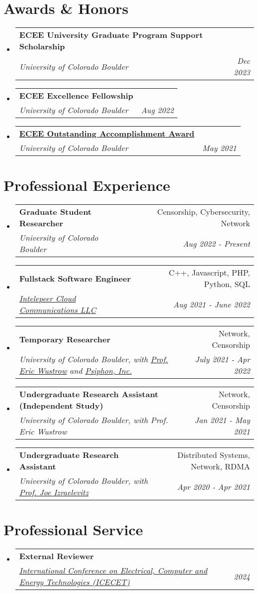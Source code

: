 \documentclass[letterpaper,11pt]{article}
\makeatletter
\newcommand{\resumeItem}[1]{
  \item\small{
    {#1 \vspace{-2pt}}
  }
}
\newcommand{\resumeSubheading}[4]{
  \vspace{-2pt}\item
    \begin{tabular*}{0.97\textwidth}[t]{l@{\extracolsep{\fill}}r}
      \textbf{#1} & #2 \\
      \textit{\small#3} & \textit{\small #4} \\
    \end{tabular*}\vspace{-7pt}
}
\newcommand{\resumeSubHeadingListStart}{\begin{itemize}[leftmargin=0.15in, label={}]}
\newcommand{\resumeSubHeadingListEnd}{\end{itemize}}
\newcommand{\resumeItemListStart}{\begin{itemize}}
\newcommand{\resumeItemListEnd}{\end{itemize}\vspace{-5pt}}
\makeatother
\begin{document}
\section{Awards \& Honors}
\resumeSubHeadingListStart
\resumeSubheading
{ECEE University Graduate Program Support Scholarship}{}
{University of Colorado Boulder}{Dec 2023}
\resumeSubheading
{ECEE Excellence Fellowship}{}
{University of Colorado Boulder}{Aug 2022}
\resumeSubheading
{\href{https://www.colorado.edu/ecee/celebrating-class-2021}{ECEE Outstanding Accomplishment Award}}{}
{University of Colorado Boulder}{May 2021}
\resumeSubHeadingListEnd
\vspace{1pt}

\section{Professional Experience}
\resumeSubHeadingListStart
\resumeSubheading
{Graduate Student Researcher}{Censorship, Cybersecurity, Network}
{University of Colorado Boulder}{Aug 2022 - Present}
\resumeSubheading
{Fullstack Software Engineer}{C++, Javascript, PHP, Python, SQL}
{\href{https://intelepeer.ai/}{Intelepeer Cloud Communications LLC}}{Aug 2021 - June 2022}
\resumeSubheading
{Temporary Researcher}{Network, Censorship}
{University of Colorado Boulder, with 
  \href{https://www.colorado.edu/ecee/eric-wustrow}{Prof. Eric Wustrow} 
and 
  \href{https://psiphon.ca/}{Psiphon, Inc.}
}{July 2021 - Apr 2022}
\resumeSubheading
{Undergraduate Research Assistant (Independent Study)}{Network, Censorship}
{University of Colorado Boulder, with Prof. Eric Wustrow}{Jan 2021 - May 2021}
\resumeSubheading
{Undergraduate Research Assistant}{Distributed Systems, Network, RDMA}
{University of Colorado Boulder, with 
  \href{https://www.colorado.edu/ecee/joseph-joe-izraelevitz}{Prof. Joe Izraelevitz}
}{Apr 2020 - Apr 2021}
\resumeSubHeadingListEnd
\vspace{1pt}

\section{Professional Service}
\resumeSubHeadingListStart
\resumeSubheading
{External Reviewer}{}
{\href{https://www.icecet.com/}{International Conference on Electrical, Computer and Energy Technologies (ICECET)}}{2024}
\resumeSubHeadingListEnd
\vspace{1pt}
\end{document}

